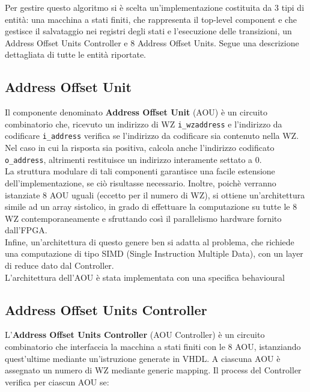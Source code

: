 \documentclass{article}
\begin{document}
Per gestire questo algoritmo si è scelta un'implementazione costituita da 3 tipi di entità: una macchina a stati finiti, che rappresenta il top-level component
e che gestisce il salvataggio nei registri degli stati e l'esecuzione delle transizioni, un Address Offset Units Controller e 8 Address Offset Units.
Segue una descrizione dettagliata di tutte le entità riportate.

\subsection{Address Offset Unit}
\label{AOU}

Il componente denominato \textbf{Address Offset Unit} (AOU) è un circuito combinatorio che, ricevuto un indirizzo di WZ \texttt{i\_wzaddress} e l'indirizzo da codificare \texttt{i\_address} verifica se l'indirizzo da codificare sia contenuto nella WZ.\\
Nel caso in cui la risposta sia positiva, calcola anche l'indirizzo codificato\\
\texttt{o\_address}, altrimenti restituisce un indirizzo interamente settato a 0.\\

La struttura modulare di tali componenti garantisce una facile estensione\\
dell'implementazione, se ciò risultasse necessario.
Inoltre, poichè verranno istanziate 8 AOU uguali (eccetto per il numero di WZ), si ottiene un'architettura simile ad un array sistolico, in grado di effettuare la computazione su tutte le 8 WZ
contemporaneamente e sfruttando così il parallelismo hardware fornito dall'FPGA.\\

Infine, un'architettura di questo genere ben si adatta al problema, che richiede una computazione di tipo SIMD (Single Instruction Multiple Data), con un layer di reduce dato dal Controller.\\

L'architettura dell'AOU è stata implementata con una specifica behavioural

\subsection{Address Offset Units Controller}
\label{Controller}

L'\textbf{Address Offset Units Controller} (AOU Controller) è un circuito combinatorio che interfaccia la macchina a stati finiti con le 8 AOU, istanziando quest'ultime
mediante un'istruzione generate in VHDL. A ciascuna AOU è assegnato un numero di WZ mediante generic mapping.
Il process del Controller verifica per ciascun AOU se:
\end{document}
